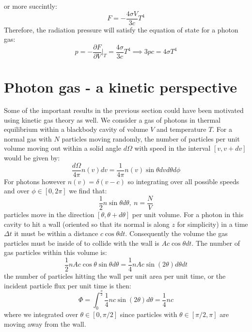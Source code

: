 \documentclass[a4paper,11pt,oneside]{book}
\begin{document}
or more succintly:
\begin{equation}
    \boxed{F=-\frac{4\sigma V}{3c}T^4}
\end{equation}
Therefore, the radiation pressure will satisfy the equation of state for a photon gas:
\begin{equation}
    p=-\frac{\partial F}{\partial V}\bigg|_T = \frac{4\sigma}{3c}T^4 \implies \boxed{3pc = 4\sigma T^4}
\end{equation}
\section{Photon gas - a kinetic perspective}
Some of the important results in the previous section could have been motivated using kinetic gas theory as well. We consider a gas of photons in thermal equilibrium within a blackbody cavity of volume $V$ and temperature $T$. For a normal gas with $N$ particles moving randomly, the number of particles per unit volume moving out within a solid angle $d\Omega$ with speed in the interval $[v,v+dv]$ would be given by:
\begin{equation}
     \frac{d\Omega}{4\pi}n(v) dv = \frac{1}{4\pi}n(v)\sin \theta dv d\theta d\phi
\end{equation}
For photons however $n(v) = \delta(v-c)$ so integrating over all possible speeds and over $\phi \in [0,2\pi]$ we find that:
\begin{equation}
    \frac{1}{2}n\sin \theta d\theta, \ n=\frac{N}{V}
\end{equation}
particles move in the direction $[\theta,\theta+d\theta]$ per unit volume. For a photon in this cavity to hit a wall (oriented so that its normal is along $z$ for simplicity) in a time $\Delta t$ it must be within a distance $c \cos \theta dt$. Consequently the volume the gas particles must be inside of to collide with the wall is $Ac \cos \theta dt$. The number of gas particles within this volume is:
\begin{equation}
    \frac{1}{2}nAc \cos \theta \sin \theta d\theta = \frac{1}{4}nAc \sin(2\theta) d\theta dt
\end{equation}
the number of particles hitting the wall per unit area per unit time, or the incident particle flux per unit time is then:
\begin{equation}
    \Phi = \int_0^{\frac{\pi}{2}}\frac{1}{4}nc\sin(2\theta) d\theta = \frac{1}{4}nc
\end{equation}
where we integrated over $\theta \in [0,\pi/2]$ since particles with $\theta \in [\pi/2,\pi]$ are moving away from the wall.
\end{document}
